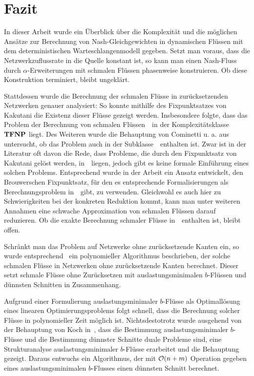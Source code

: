 \newenvironment{absolutelynopagebreak}
{\par\nobreak\vfil\penalty0\vfilneg
	\vtop\bgroup}
{\par\xdef\tpd{\the\prevdepth}\egroup
	\prevdepth=\tpd}

\chapter{Fazit}

In dieser Arbeit wurde ein Überblick über die Komplexität und die möglichen Ansätze zur Berechnung von Nash-Gleichgewichten in dynamischen Flüssen mit dem deterministischen Warteschlangenmodell gegeben.
Setzt man voraus, dass die Netzwerkzuflussrate in die Quelle konstant ist, so kann man einen Nash-Fluss durch $\alpha$-Erweiterungen mit schmalen Flüssen phasenweise konstruieren.
Ob diese Konstruktion terminiert, bleibt ungeklärt.

Stattdessen wurde die Berechnung der schmalen Flüsse in zurücksetzenden Netzwerken genauer analysiert:
So konnte mithilfe des Fixpunktsatzes von Kakutani die Existenz dieser Flüsse gezeigt werden.
Insbesondere folgte, dass das Problem der Berechnung von schmalen Flüssen~\probTFwR\ in der Komplexitätsklasse~$\mathbf{TFNP}$ liegt.
Des Weiteren wurde die Behauptung von Cominetti u. a. aus~\cite{Cominetti2015} untersucht, ob das Problem auch in der Subklasse~\PPAD\ enthalten ist.
Zwar ist in der Literatur oft davon die Rede, dass Probleme, die durch den Fixpunktsatz von Kakutani gelöst werden, in~\PPAD\ liegen, jedoch gibt es keine formale Einführung eines solchen Problems.
Entsprechend wurde in der Arbeit ein Ansatz entwickelt, den Brouwerschen Fixpunktsatz, für den es entsprechende Formalisierungen als Berechnungsproblem in~\PPAD\ gibt, zu verwenden.
Gleichwohl es auch hier zu Schwierigkeiten bei der konkreten Reduktion kommt, kann man unter weiteren Annahmen eine schwache Approximation von schmalen Flüssen darauf reduzieren.
Ob die exakte Berechnung schmaler Flüsse in~\PPAD\ enthalten ist, bleibt offen.

Schränkt man das Problem auf Netzwerke ohne zurücksetzende Kanten ein, so wurde entsprechend~\cite{Koch2012} ein polynomieller Algorithmus beschrieben, der solche schmalen Flüsse in Netzwerken ohne zurücksetzende Kanten berechnet.
Dieser setzt schmale Flüsse ohne Zurücksetzen mit auslastungsminimalen $b$-Flüssen und dünnsten Schnitten in Zusammenhang.

Aufgrund einer Formulierung auslastungsminimaler $b$-Flüsse als Optimallösung eines linearen Optimierungsproblems folgt schnell, dass die Berechnung solcher Flüsse in polynomieller Zeit möglich ist.
Nichtsdestotrotz wurde ausgehend von der Behauptung von Koch in~\cite{Koch2012}, dass die Bestimmung auslastungsminimaler $b$-Flüsse und die Bestimmung dünnster Schnitte duale Probleme sind, eine Strukturanalyse auslastungsminimaler $b$-Flüsse erarbeitet und die Behauptung gezeigt.
Daraus entwuchs ein Algorithmus, der mit $\mathcal{O}(n+m)$ Operation gegeben eines auslastungsminimalen $b$-Flusses einen dünnsten Schnitt berechnet.

